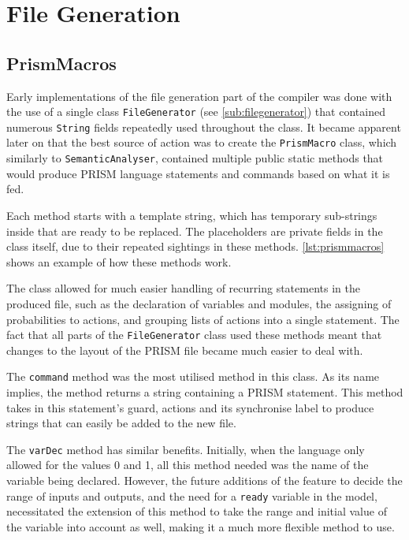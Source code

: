 \documentclass[report.tex]{subfiles}
\begin{document}
\section{File Generation} %
\label{sec:file_generation}
\subsection{PrismMacros} %
\label{sub:prismmacros}
Early implementations of the file generation part of the compiler was done with
the use of a single class \texttt{FileGenerator} (see \ref{sub:filegenerator})
that contained numerous \texttt{String} fields repeatedly used throughout the
class. It became apparent later on that the best source of action was to create
the \texttt{PrismMacro} class, which similarly to \texttt{SemanticAnalyser},
contained multiple public static methods that would produce PRISM language
statements and commands based on what it is fed.

Each method starts with a template string, which has temporary sub-strings
inside that are ready to be replaced. The placeholders are private fields in the
class itself, due to their repeated sightings in these methods. 
\ref{lst:prismmacros} shows an example of how these methods work.



The class allowed for much easier handling of recurring statements in the
produced file, such as the declaration of variables and modules, the assigning
of probabilities to actions, and grouping lists of actions into a single
statement. The fact that all parts of the \texttt{FileGenerator} class used
these methods meant that changes to the layout of the PRISM file became much
easier to deal with.

The \texttt{command} method was the most utilised method in this class. As its
name implies, the method returns a string containing a PRISM statement. This
method takes in this statement's guard, actions and its synchronise label to
produce strings that can easily be added to the new file.

The \texttt{varDec} method has similar benefits. Initially, when the language
only allowed for the values 0 and 1, all this method needed was the name of the
variable being declared. However, the future additions of the feature to
decide the range of inputs and outputs, and the need for a \texttt{ready}
variable in the model, necessitated the extension of this method to take the
range and initial value of the variable into account as well, making it a much
more flexible method to use.
\end{document}
